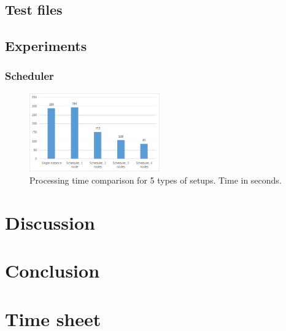 \documentclass{acm_proc_article-sp}
\begin{document}
\subsection{Test files}

\subsection{Experiments}

\subsubsection{Scheduler}
\begin{figure}[]
	\centering
	\includegraphics[width=0.5\textwidth]{images/diagram_total_processing.jpg}
	\caption{Processing time comparison for 5 types of setups. Time in seconds.}
	\label{fig:diagram_total_processing}
\end{figure}


\section{Discussion}
\label{sec:discussion}

\section{Conclusion}
\label{sec:conclusion}

{}


\appendix
\section{Time sheet}
\end{document}
